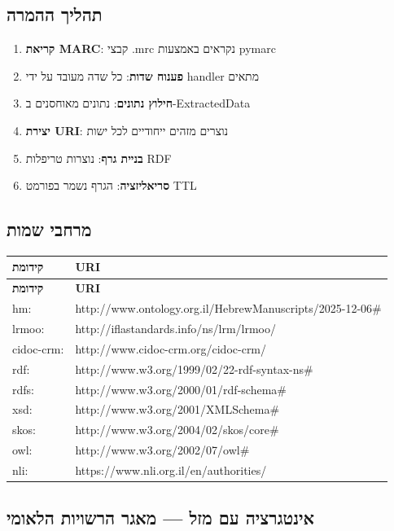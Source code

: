 \documentclass[12pt,a4paper]{article}
\newcommand{\new}[1]{\textcolor{newaddition}{#1}}
\begin{document}
\subsection{תהליך ההמרה}

\begin{enumerate}
\item \textbf{קריאת MARC}: קבצי .mrc נקראים באמצעות pymarc
\item \textbf{פענוח שדות}: כל שדה מעובד על ידי handler מתאים
\item \textbf{חילוץ נתונים}: נתונים מאוחסנים ב-ExtractedData
\item \textbf{יצירת URI}: נוצרים מזהים ייחודיים לכל ישות
\item \textbf{בניית גרף}: נוצרות טריפלות RDF
\item \textbf{סריאליזציה}: הגרף נשמר בפורמט TTL
\end{enumerate}

\subsection{מרחבי שמות}

\begin{longtable}{|L{3cm}|L{13cm}|}
\hline
\textbf{קידומת} & \textbf{URI} \\
\hline
\endfirsthead
\hline
\textbf{קידומת} & \textbf{URI} \\
\hline
\endhead
\hline
\endfoot
hm: & http://www.ontology.org.il/HebrewManuscripts/2025-12-06\# \\
\hline
lrmoo: & http://iflastandards.info/ns/lrm/lrmoo/ \\
\hline
cidoc-crm: & http://www.cidoc-crm.org/cidoc-crm/ \\
\hline
rdf: & http://www.w3.org/1999/02/22-rdf-syntax-ns\# \\
\hline
rdfs: & http://www.w3.org/2000/01/rdf-schema\# \\
\hline
xsd: & http://www.w3.org/2001/XMLSchema\# \\
\hline
skos: & http://www.w3.org/2004/02/skos/core\# \\
\hline
owl: & http://www.w3.org/2002/07/owl\# \\
\hline
\new{nli:} & \new{https://www.nli.org.il/en/authorities/} \\
\hline
\end{longtable}

\subsection{\new{אינטגרציה עם מזל — מאגר הרשויות הלאומי}}
\end{document}
